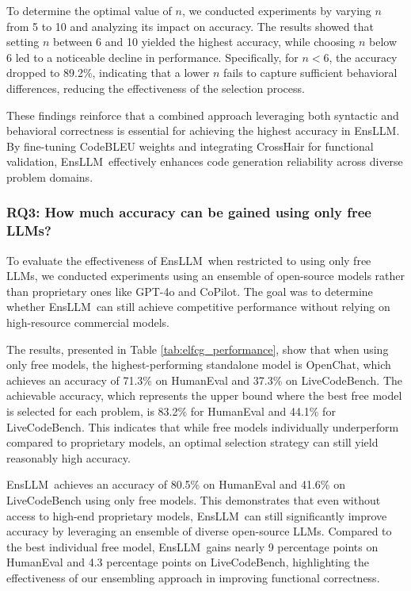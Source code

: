 \documentclass{article}
\newcommand{\tool}{EnsLLM}
\begin{document}
To determine the optimal value of \( n \), we conducted experiments by varying \( n \) from 5 to 10 and analyzing its impact on accuracy. The results showed that setting \( n \) between 6 and 10 yielded the highest accuracy, while choosing \( n \) below 6 led to a noticeable decline in performance. Specifically, for \( n < 6 \), the accuracy dropped to 89.2\%, indicating that a lower \( n \) fails to capture sufficient behavioral differences, reducing the effectiveness of the selection process.

These findings reinforce that a combined approach leveraging both syntactic and behavioral correctness is essential for achieving the highest accuracy in \tool. By fine-tuning CodeBLEU weights and integrating CrossHair for functional validation, \tool\ effectively enhances code generation reliability across diverse problem domains.

\subsubsection{RQ3: How much accuracy can be gained using only free LLMs?}

\leavevmode\par
To evaluate the effectiveness of \tool\ when restricted to using only free LLMs, we conducted experiments using an ensemble of open-source models rather than proprietary ones like GPT-4o and CoPilot. The goal was to determine whether \tool\ can still achieve competitive performance without relying on high-resource commercial models.

The results, presented in Table \ref{tab:elfcg_performance}, show that when using only free models, the highest-performing standalone model is OpenChat, which achieves an accuracy of 71.3\% on HumanEval and 37.3\% on LiveCodeBench. The achievable accuracy, which represents the upper bound where the best free model is selected for each problem, is 83.2\% for HumanEval and 44.1\% for LiveCodeBench. This indicates that while free models individually underperform compared to proprietary models, an optimal selection strategy can still yield reasonably high accuracy.

\tool\ achieves an accuracy of 80.5\% on HumanEval and 41.6\% on LiveCodeBench using only free models. This demonstrates that even without access to high-end proprietary models, \tool\ can still significantly improve accuracy by leveraging an ensemble of diverse open-source LLMs. Compared to the best individual free model, \tool\ gains nearly 9 percentage points on HumanEval and 4.3 percentage points on LiveCodeBench, highlighting the effectiveness of our ensembling approach in improving functional correctness.
\end{document}
